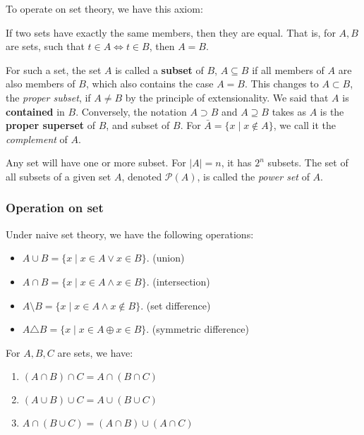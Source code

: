 To operate on set theory, we have this axiom: 
\begin{axiom}
    If two sets have exactly the same members, then they are equal. That is, for $A,B$ are sets, such that $t\in A \iff t\in B$, then $A=B$.
\end{axiom}
For such a set, the set $A$ is called a \textbf{subset} of $B$, $A\subseteq B$ if all members of $A$ are also members of $B$, which also contains the case $A=B$. This changes to $A\subset B$, the \textit{proper subset}, if $A\neq B$ by the principle of extensionality. We said that $A$ is \textbf{contained} in $B$. Conversely, the notation $A\supset B$ and $A\supseteq B$ takes as $A$ is the \textbf{proper superset} of $B$, and subset of $B$. For $\bar{A}=\{x\mid x\not\in A\}$, we call it the \textit{complement} of $A$. 

Any set will have one or more subset. For $|A|=n$, it has $2^n$ subsets. The set of all subsets of a given set $A$, denoted $\mathcal{P}(A)$, is called the \textit{power set} of $A$. 

\subsubsection{Operation on set}
Under naive set theory, we have the following operations: 
\begin{itemize}[noitemsep,topsep=0pt]
    \item $A\cup B = \{x\mid x\in A \lor x\in B\}$. (union)
    \item  $A\cap B = \{x\mid x\in A \land x\in B\}$. (intersection)
    \item $A\setminus B = \{x\mid x\in A \land x \not\in B\}$. (set difference) 
    \item $A\triangle B = \{x\mid x\in A \oplus x\in B\}$. (symmetric difference)
\end{itemize}

\begin{theorem}[operations]
    For $A,B,C$ are sets, we have: 

    \begin{enumerate}
        \item $(A\cap B)\cap C=A\cap(B\cap C)$
        \item $(A\cup B)\cup C=A\cup(B\cup C)$
        \item $A\cap(B\cup C)=(A\cap B)\cup(A\cap C)$
    \end{enumerate}
\end{theorem}

